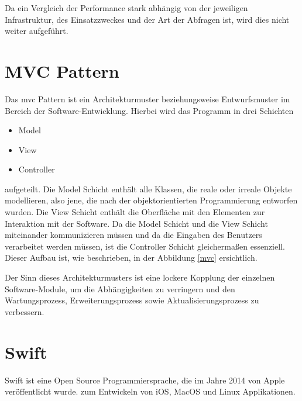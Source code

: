 Da ein Vergleich der Performance stark abhängig von der jeweiligen Infrastruktur, des Einsatzzweckes und der Art der Abfragen ist, wird dies nicht weiter aufgeführt.

\clearpage

\section{MVC Pattern}
Das \gls{mvc} Pattern ist ein Architekturmuster beziehungsweise Entwurfsmuster im Bereich der Software-Entwicklung. 
Hierbei wird das Programm in drei Schichten
\begin{itemize}
	\item Model
	\item View
	\item Controller
\end{itemize}
aufgeteilt. Die Model Schicht enthält alle Klassen, die reale oder irreale Objekte modellieren, also jene, die nach der objektorientierten Programmierung entworfen wurden. Die View Schicht enthält die Oberfläche mit den Elementen zur Interaktion mit der Software. Da die Model Schicht und die View Schicht miteinander kommunizieren müssen und da die Eingaben des Benutzers verarbeitet werden müssen, ist die Controller Schicht gleichermaßen essenziell. Dieser Aufbau ist, wie beschrieben, in der Abbildung \ref{mvc} ersichtlich.


Der Sinn dieses Architekturmusters ist eine lockere Kopplung der einzelnen Software-Module, um die Abhängigkeiten zu verringern und den Wartungsprozess, Erweiterungsprozess sowie Aktualisierungsprozess zu verbessern.

\clearpage

\section{Swift}
Swift ist eine Open Source Programmiersprache, die im Jahre 2014 von Apple veröffentlicht wurde. zum Entwickeln von iOS, MacOS und Linux Applikationen.


\clearpage

